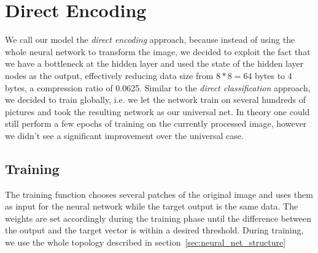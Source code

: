 \section{Direct Encoding} \label{sec:de}
We call our model the \emph{direct encoding} approach, because instead of using the whole neural network to transform the image, we decided to exploit the fact that we have a bottleneck at the hidden layer and used the state of the hidden layer nodes as the output, effectively reducing data size from \(8 * 8 = 64\) bytes to 4 bytes, a compression ratio of 0.0625.
Similar to the \emph{direct classification} approach, we decided to train globally, i.e. we let the network train on several hundreds of pictures and took the resulting network as our universal net. In theory one could still perform a few epochs of training on the currently processed image, however we didn't see a significant improvement over the universal case. 

\subsection{Training} \label{sec:trainfcn}
The training function chooses several patches of the original image and uses them as input for the neural network while the target output is the same data. The weights are set accordingly during the training phase until the difference between the output and the target vector is within a desired threshold. During training, we use the whole topology described in section~\ref{sec:neural_net_structure} 


